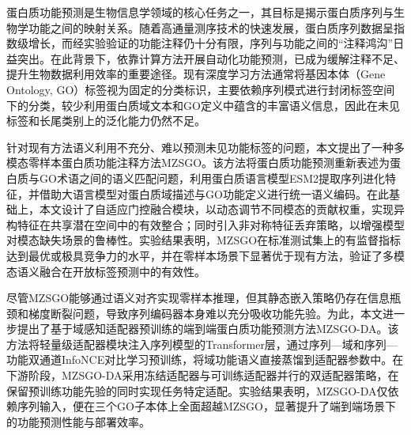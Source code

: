 \begin{cabstract}

蛋白质功能预测是生物信息学领域的核心任务之一，其目标是揭示蛋白质序列与生物学功能之间的映射关系。随着高通量测序技术的快速发展，蛋白质序列数据呈指数级增长，而经实验验证的功能注释仍十分有限，序列与功能之间的“注释鸿沟”日益突出。在此背景下，依靠计算方法开展自动化功能预测，已成为缓解注释不足、提升生物数据利用效率的重要途径。现有深度学习方法通常将基因本体（Gene Ontology, GO）标签视为固定的分类标识，主要依赖序列模式进行封闭标签空间下的分类，较少利用蛋白质域文本和GO定义中蕴含的丰富语义信息，因此在未见标签和长尾类别上的泛化能力仍然不足。

针对现有方法语义利用不充分、难以预测未见功能标签的问题，本文提出了一种多模态零样本蛋白质功能注释方法MZSGO。该方法将蛋白质功能预测重新表述为蛋白质与GO术语之间的语义匹配问题，利用蛋白质语言模型ESM2提取序列进化特征，并借助大语言模型对蛋白质域描述与GO功能定义进行统一语义编码。在此基础上，本文设计了自适应门控融合模块，以动态调节不同模态的贡献权重，实现异构特征在共享潜在空间中的有效整合；同时引入非对称特征丢弃策略，以增强模型对模态缺失场景的鲁棒性。实验结果表明，MZSGO在标准测试集上的有监督指标达到最优或极具竞争力的水平，并在零样本场景下显著优于现有方法，验证了多模态语义融合在开放标签预测中的有效性。

尽管MZSGO能够通过语义对齐实现零样本推理，但其静态嵌入策略仍存在信息瓶颈和梯度断裂问题，导致序列编码器本身难以充分吸收功能先验。为此，本文进一步提出了基于域感知适配器预训练的端到端蛋白质功能预测方法MZSGO-DA。该方法将轻量级适配器模块注入序列模型的Transformer层，通过序列—域和序列—功能双通道InfoNCE对比学习预训练，将域功能语义直接蒸馏到适配器参数中。在下游阶段，MZSGO-DA采用冻结适配器与可训练适配器并行的双适配器策略，在保留预训练功能先验的同时实现任务特定适配。实验结果表明，MZSGO-DA仅依赖序列输入，便在三个GO子本体上全面超越MZSGO，显著提升了端到端场景下的功能预测性能与部署效率。

\end{cabstract}

